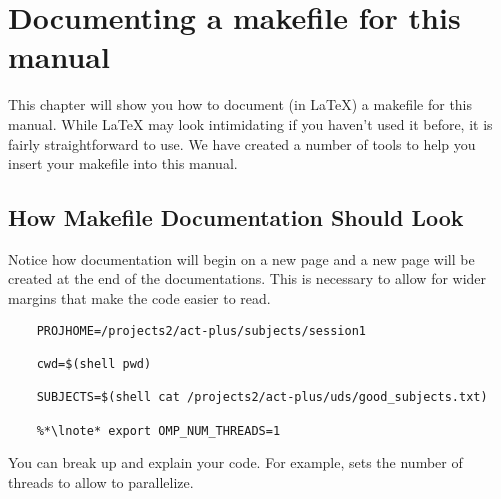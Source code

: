 \chapter{Documenting a makefile for this manual}

This chapter will show you how to document (in \LaTeX) a makefile for this manual. While \LaTeX{} may look intimidating if you haven't used it before, it is fairly straightforward to use. We have created a number of tools to help you insert your makefile into this manual.



\section{How Makefile Documentation Should Look}

Notice how documentation will begin on a new page and a new page will be created at the end of the documentations. This is necessary to allow for wider margins that make the code easier to read.



\begin{lstlisting}
	PROJHOME=/projects2/act-plus/subjects/session1
	
	cwd=$(shell pwd)
	
	SUBJECTS=$(shell cat /projects2/act-plus/uds/good_subjects.txt)
	
	%*\lnote* export OMP_NUM_THREADS=1

\end{lstlisting}

You can break up and explain your code. For example,  sets the number of threads to allow \maken{} to parallelize.

